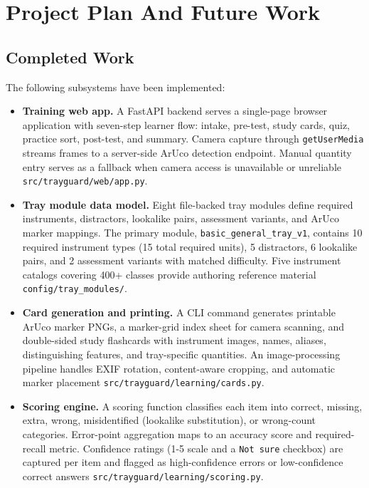 \documentclass[10pt,a4paper]{article}
\begin{document}

\section{Project Plan And Future Work}
\label{sec:project-plan-and-future-work}
\subsection{Completed Work}


The following subsystems have been implemented:

\begin{itemize}
  \item \textbf{Training web app.} A FastAPI backend serves a single-page browser application with seven-step learner flow: intake, pre-test, study cards, quiz, practice sort, post-test, and summary. Camera capture through \texttt{getUserMedia} streams frames to a server-side ArUco detection endpoint. Manual quantity entry serves as a fallback when camera access is unavailable or unreliable \texttt{src/trayguard/web/app.py}.
  \item \textbf{Tray module data model.} Eight file-backed tray modules define required instruments, distractors, lookalike pairs, assessment variants, and ArUco marker mappings. The primary module, \texttt{basic\_general\_tray\_v1}, contains 10 required instrument types (15 total required units), 5 distractors, 6 lookalike pairs, and 2 assessment variants with matched difficulty. Five instrument catalogs covering 400+ classes provide authoring reference material \texttt{config/tray\_modules/}.
  \item \textbf{Card generation and printing.} A CLI command generates printable ArUco marker PNGs, a marker-grid index sheet for camera scanning, and double-sided study flashcards with instrument images, names, aliases, distinguishing features, and tray-specific quantities. An image-processing pipeline handles EXIF rotation, content-aware cropping, and automatic marker placement \texttt{src/trayguard/learning/cards.py}.
  \item \textbf{Scoring engine.} A scoring function classifies each item into correct, missing, extra, wrong, misidentified (lookalike substitution), or wrong-count categories. Error-point aggregation maps to an accuracy score and required-recall metric. Confidence ratings (1-5 scale and a \texttt{Not sure} checkbox) are captured per item and flagged as high-confidence errors or low-confidence correct answers \texttt{src/trayguard/learning/scoring.py}.

\end{itemize}
\end{document}
